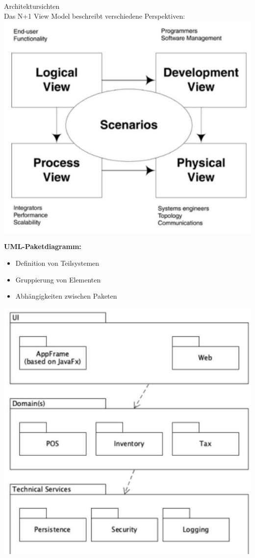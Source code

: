 \begin{concept}{Architektursichten}\\
Das N+1 View Model beschreibt verschiedene Perspektiven:
\includegraphics[width=0.9\linewidth]{images/2024_12_29_0d1d7b5551ea1b4b41bdg-09}

\textbf{UML-Paketdiagramm:}
\begin{itemize}
    \item Definition von Teilsystemen
    \item Gruppierung von Elementen
    \item Abhängigkeiten zwischen Paketen
\end{itemize}
\includegraphics[width=0.9\linewidth]{images/2024_12_29_0d1d7b5551ea1b4b41bdg-09(1)}
\end{concept}

